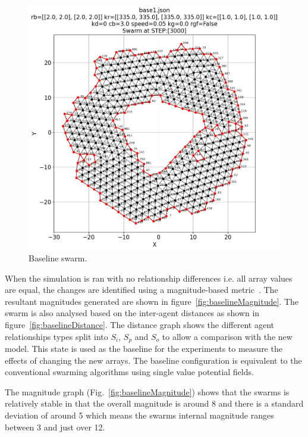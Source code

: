 \documentclass[12pt,a4paper]{IEEEtran}
\begin{document}
\begin{figure}[H]
	\begin{center}
		\includegraphics[width=1.0\linewidth]{figures/baseline}
	\end{center}
	\caption{Baseline swarm. \label{fig:baselineSwarm}}
\end{figure}

When the simulation is ran with no relationship differences i.e. all array values are equal, the changes are identified using a magnitude-based metric~\cite{eliot2018metric}. The resultant magnitudes generated are shown in figure~\ref{fig:baselineMagnitude}. The swarm is also analysed based on the inter-agent distances as shown in figure~\ref{fig:baselineDistance}. The distance graph shows the different agent relationships types split into $S_{i}$, $S_{p}$ and $S_{o}$ to allow a comparison with the new model. This state is used as the baseline for the experiments to measure the effects of changing the new arrays. The baseline configuration is equivalent to the conventional swarming algorithms using single value potential fields.

The magnitude graph (Fig.~\ref{fig:baselineMagnitude}) shows that the swarms is relatively stable in that the overall magnitude is around 8 and there is a standard deviation of around 5 which means the swarms internal magnitude ranges between 3 and just over 12.
\end{document}
